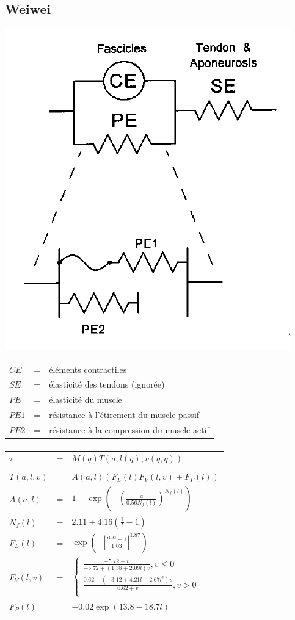 \documentclass[pdftex,a4paper,11pt]{article}
\begin{document}

\subsection{Weiwei}

\begin{center}
        \includegraphics[width=.40\linewidth]{fig/brown}
\end{center}

\begin{tabular}{lcl}
    $CE$  & = & éléments contractiles \\
    $SE$  & = & élasticité des tendons (ignorée) \\
    $PE$  & = & élasticité du muscle \\
    $PE1$ & = & résistance à l'étirement du muscle passif \\
    $PE2$ & = & résistance à la compression du muscle actif \\
\end{tabular}

\paragraph{}
\begin{tabular}{lcl}
    $\tau$ & = & $M(q) T(a, l(q), v(q, \dot{q}))$ \\
    \\
    $T(a, l, v)$ & = & $A(a,l)(F_L(l) F_V(l,v) + F_P(l))$ \\
    $A(a, l)$    & = & $1 - \exp \left(- \left(\frac{a}{0.56 N_f(l)}\right)^{N_f(l)}\right)$ \\
    $N_f(l)$     & = & $2.11 + 4.16 \left(\frac{1}{l} - 1\right)$ \\
    $F_L(l)$     & = & $\exp \left(-\left|\frac{l^{1.93} - 1}{1.03}\right|^{1.87}\right)$ \\
    $F_V(l, v)$  & = & $\left\{ 
        \begin{array}{l}
            \frac{-5.72 - v}{-5.72 + (1.38 + 2.09 l) v}, v \leq 0 \\
            \frac{0.62 - \left(-3.12 + 4.21 l - 2.67 l^2\right) v}{0.62 + v}, v > 0 \\
        \end{array}
        \right.$ \\
    $F_P(l)$     & = & $-0.02 \exp(13.8 - 18.7 l)$ \\
\end{tabular}
\end{document}
